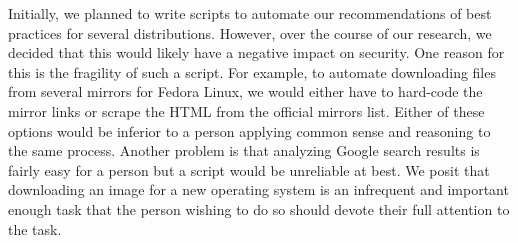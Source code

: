 \documentclass[conference]{IEEEtran}
\begin{document}
Initially, we planned to write scripts to automate our recommendations of best practices
for several distributions. However, over the course of our research, we decided that this
would likely have a negative impact on security. One reason for this is the fragility of
such a script. For example, to automate downloading files from several mirrors for Fedora
Linux, we would either have to hard-code the mirror links or scrape the HTML from the
official mirrors list. Either of these options would be inferior to a person applying
common sense and reasoning to the same process. Another problem is that analyzing Google
search results is fairly easy for a person but a script would be unreliable at best.
We posit that downloading an image for a new operating system is an infrequent and 
important enough task that the person wishing to do so should devote their full attention
to the task.

%
%

\end{document}
